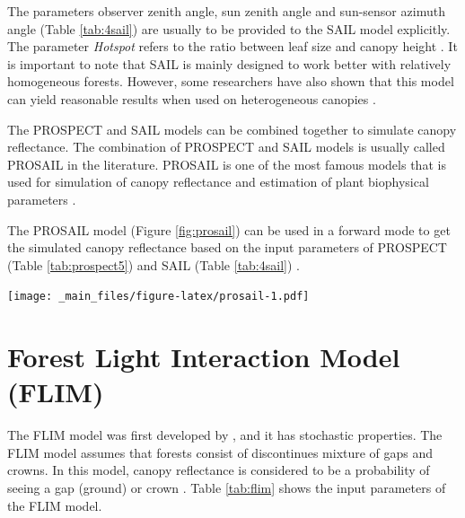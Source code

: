 \documentclass[a4paper, twoside]{templates/ociamthesis}
\let\origfigure\figure
\let\endorigfigure\endfigure
\renewenvironment{figure}[1][2] {
    \expandafter\origfigure\expandafter[H]
} {
    \endorigfigure
}
\begin{document}
The parameters observer zenith angle, sun zenith angle and sun-sensor azimuth angle (Table \ref{tab:4sail}) are usually to be provided to the SAIL model explicitly. The parameter \emph{Hotspot} refers to the ratio between leaf size and canopy height \citep{berger2018evaluation}. It is important to note that SAIL is mainly designed to work better with relatively homogeneous forests. However, some researchers have also shown that this model can yield reasonable results when used on heterogeneous canopies \citep{jay2017retrieving}.

The PROSPECT and SAIL models can be combined together to simulate canopy reflectance. The combination of PROSPECT and SAIL models is usually called PROSAIL in the literature. PROSAIL is one of the most famous models that is used for simulation of canopy reflectance and estimation of plant biophysical parameters \citep{berger2018evaluation, jay2017retrieving}.

The PROSAIL model (Figure \ref{fig:prosail}) can be used in a forward mode to get the simulated canopy reflectance based on the input parameters of PROSPECT (Table \ref{tab:prospect5}) and SAIL (Table \ref{tab:4sail}) \citep{berger2018evaluation}.

\newpage

\begin{figure}
\centering
\texttt{[image: \_main\_files/figure-latex/prosail-1.pdf]}
\caption{\label{fig:prosail}Diagram of PROSAIL as a combination of PROSPECT5 and 4SAIL in the forward mode}
\end{figure}

\hypertarget{flim}{%
\section{Forest Light Interaction Model (FLIM)}\label{flim}}

The FLIM model was first developed by \citet{rosema1992new}, and it has stochastic properties. The FLIM model assumes that forests consist of discontinues mixture of gaps and crowns. In this model, canopy reflectance is considered to be a probability of seeing a gap (ground) or crown \citep{rosema1992new}. Table \ref{tab:flim} shows the input parameters of the FLIM model.
\end{document}
